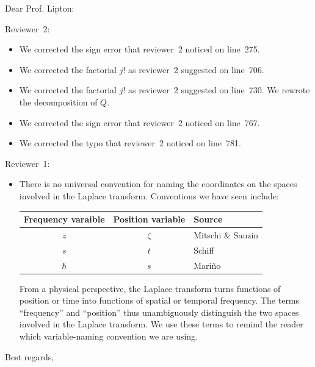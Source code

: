 \documentclass{letter}
\date{March \textcolor{violet}{--}, 2023}
\begin{document}
\begin{letter}{}
\opening{Dear Prof. Lipton:}

\color{violet}
Reviewer~2:
\begin{itemize}
    \item We corrected the sign error that reviewer~2 noticed on line~275.
    \item We corrected the factorial $j!$ as reviewer~2 suggested on line~706.
     \item We corrected the factorial $j!$ as reviewer~2 suggested on line~730. We rewrote the decomposition of $Q$. 
     \item We corrected the sign error that reviewer~2 noticed on line~767.
      \item We corrected the typo that reviewer~2 noticed on line~781.
\end{itemize}
Reviewer~1:
\begin{itemize}
\item There is no universal convention for naming the coordinates on the spaces involved in the Laplace transform. Conventions we have seen include:
\begin{center}
\begin{tabular}{c|c|l}
Frequency varaible & Position variable & Source \\ \hline
$z$ & $\zeta$ & Mitschi \& Sauzin \\
$s$ & $t$ & Schiff \\
$\hbar$ & $s$ & Mari\~{n}o \\
\end{tabular}
\end{center}
From a physical perspective, the Laplace transform turns functions of position or time into functions of spatial or temporal frequency. The terms ``frequency'' and ``position'' thus unambiguously distinguish the two spaces involved in the Laplace transform. We use these terms to remind the reader which variable-naming convention we are using.
\end{itemize}
\color{black}
\closing{Best regards,}
\end{letter}
\end{document}
